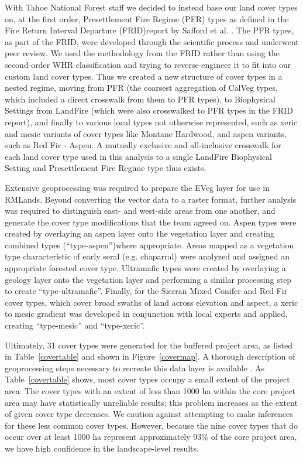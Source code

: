 With Tahoe National Forest staff we decided to instead base our land cover types on, at the first order, Presettlement Fire Regime (PFR) types as defined in the Fire Return Interval Departure (FRID)report by Safford et al. . The PFR types, as part of the FRID, were developed through the scientific process and underwent peer review. We used the methodology from the FRID rather than using the second-order WHR classification and trying to reverse-engineer it to fit into our custom land cover types. Thus we created a new structure of cover types in a nested regime, moving from PFR (the coarsest aggregation of CalVeg types, which included a direct crosswalk from them to PFR types), to Biophysical Settings from LandFire (which were also crosswalked to PFR types in the FRID report), and finally to various local types not otherwise represented, such as xeric and mesic variants of cover types like Montane Hardwood, and aspen variants, such as Red Fir - Aspen. A mutually exclusive and all-inclusive crosswalk for each land cover type used in this analysis to a single LandFire Biophysical Setting and Presettlement Fire Regime type thus exists.

Extensive geoprocessing was required to prepare the EVeg layer for use in RMLands. Beyond converting the vector data to a raster format, further analysis was required to distinguish east- and west-side areas from one another, and generate the cover type modifications that the team agreed on. Aspen types were created by overlaying an aspen layer onto the vegetation layer and creating combined types (``type-aspen'')where appropriate. Areas mapped as a vegetation type characteristic of early seral (e.g. chaparral) were analyzed and assigned an appropriate forested cover type. Ultramafic types were created by overlaying a geology layer onto the vegetation layer and performing a similar processing step to create ``type-ultramafic''. Finally, for the Sierran Mixed Conifer and Red Fir cover types, which cover broad swaths of land across elevation and aspect, a xeric to mesic gradient was developed in conjunction with local experts and applied, creating ``type-mesic'' and ``type-xeric''. 

Ultimately, 31 cover types were generated for the buffered project area, as listed in Table~\ref{covertable} and shown in Figure~\ref{covermap}. A thorough description of geoprocessing steps necessary to recreate this data layer is available . As Table~\ref{covertable} shows, most cover types occupy a small extent of the project area. The cover types with an extent of less than 1000 ha within the core project area may have statistically unreliable results; this problem increases as the extent of given cover type decreases. We caution against attempting to make inferences for these less common cover types. However, because the nine cover types that do occur over at least 1000 ha represent approximately 93\% of the core project area, we have high confidence in the landscape-level results.

